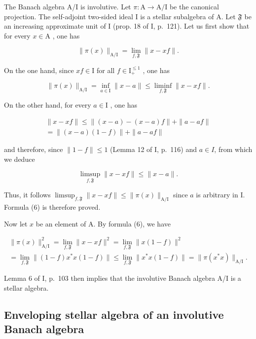 The Banach algebra A/I is involutive. Let \(\pi\colon\mathrm{A}\to\mathrm{A}/\mathrm{I}\) be the canonical projection. The self-adjoint two-sided ideal I is a stellar subalgebra of A. Let \(\mathfrak{F}\) be an increasing approximate unit of I (prop. 18 of I, p.~121). Let us first show that for every \(x\in\mathrm{A}\) , one has

\[
\| \pi (x) \| _ {\mathrm{A/I}} = \lim _ {f, \mathfrak {F}} \| x - x f \|.\tag{6}
\]

On the one hand, since \(xf \in \mathrm{I}\) for all \(f \in \mathrm{I}_{+}^{\leqslant 1}\) , one has

\[
\| \pi (x) \| _ {\mathrm{A} / \mathrm{I}} = \inf _ {a \in \mathrm{I}} \| x - a \| \leqslant \operatorname * {l i m i n f} _ {f, \mathfrak {F}} \| x - x f \|.
\]

On the other hand, for every \(a \in \mathrm{I}\) , one has

\[
\begin{array}{c} \| x - x f \| \leqslant \| (x - a) - (x - a) f \| + \| a - a f \| \\ = \| (x - a) (1 - f) \| + \| a - a f \| \end{array}
\]

and therefore, since \(\|1 - f\| \leqslant 1\) (Lemma 12 of I, p.~116) and \(a \in I\), from which we deduce

\[
\operatorname * {l i m s u p} _ {f, \mathfrak {F}} \| x - x f \| \leqslant \| x - a \|.
\]

Thus, it follows \(\limsup_{f,\mathfrak{F}} \|x - xf\| \leqslant \|\pi(x)\|_{\mathrm{A/I}}\) since \(a\) is arbitrary in I. Formula (6) is therefore proved.

Now let \(x\) be an element of A. By formula (6), we have

\[
\begin{array}{c} \| \pi (x) \| _ {\mathrm{A/I}} ^ {2} = \lim _ {f, \mathfrak {F}} \| x - x f \| ^ {2} = \lim _ {f, \mathfrak {F}} \| x (1 - f) \| ^ {2} \\ = \lim _ {f, \mathfrak {F}} \| (1 - f) x ^ {*} x (1 - f) \| \leqslant \lim _ {f, \mathfrak {F}} \| x ^ {*} x (1 - f) \| = \| \pi (x ^ {*} x) \| _ {\mathrm{A/I}}. \end{array}
\]

Lemma 6 of I, p.~103 then implies that the involutive Banach algebra A/I is a stellar algebra.

\subsection{Enveloping stellar algebra of an involutive Banach algebra}

